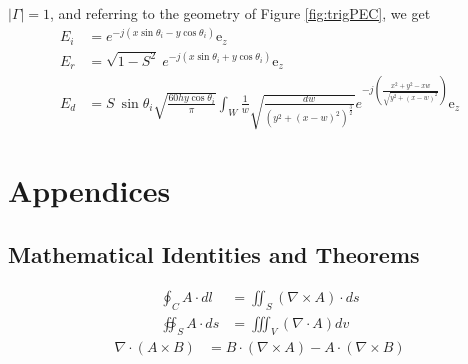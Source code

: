 \documentclass{article}
\numberwithin{equation}{section}
\begin{document}
            $\left| \Gamma \right| = 1$, and referring to the geometry of Figure
            \ref{fig:trigPEC}, we get
            \small
            \begin{subequations}
                \begin{align}
                    E_i &= e^{-j(x \sin \theta_i - y \cos \theta_i)} \text{e}_z \\
                    E_r &= \sqrt{1 - S^{2}} \ e^{-j(x \sin \theta_i + y \cos \theta_i)}
                        \text{e}_z \\
                    E_d &= S \ \sin \theta_i \sqrt{\frac{60hy \cos \theta_i}{\pi}} \int_W
                    \frac{1}{w} \sqrt{\frac{ dw }{\left( y^{2} + (x - w)^{2} \right)^{\frac{3}{2}} }}
                    e^{-j\left(\frac{x^{2} + y^{2} -xw}{\sqrt{y^{2} +(x-w)^{2}}}\right)} \text{e}_z
                \end{align}
            \end{subequations}
            \normalsize
    \newpage
    \renewcommand{\thesubsection}{\Alph{subsection}}
    \appendix
    \section*{Appendices}
    \subsection{Mathematical Identities and Theorems}
        \begin{subequations} \label{eq:integralVectorTheorems}
            \begin{align}
                \oint_C A \cdot dl &= \iint_S (\nabla \times A) \cdot ds
                    \label{eq:stokes} \\
                \oiint_S A \cdot ds &= \iiint_V (\nabla \cdot A) dv \label{eq:divergence}
            \end{align}
        \end{subequations}
        \begin{subequations} \label{eq:vectorDifferentialIdentities}
            \begin{align}
                \nabla \cdot (A \times B) &= B \cdot (\nabla \times A) - A \cdot (\nabla
                    \times B) \label{eq:divOfCurlOfProduct}
            \end{align}
        \end{subequations}
        \newpage
\end{document}
